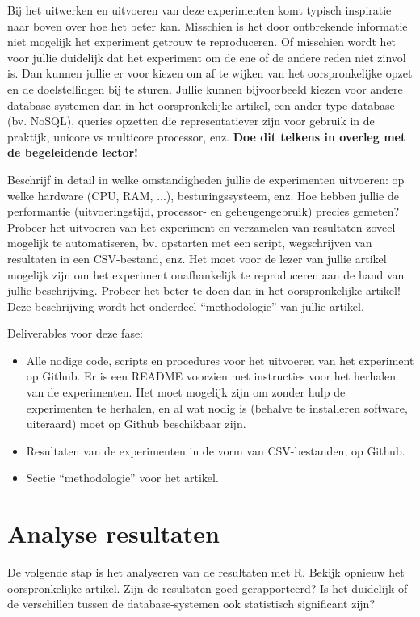 \documentclass[fleqn,10pt]{voorstel}
\begin{document}
Bij het uitwerken en uitvoeren van deze experimenten komt typisch inspiratie naar boven over hoe het beter kan. Misschien is het door ontbrekende informatie niet mogelijk het experiment getrouw te reproduceren. Of misschien wordt het voor jullie duidelijk dat het experiment om de ene of de andere reden niet zinvol is. Dan kunnen jullie er voor kiezen om af te wijken van het oorspronkelijke opzet en de doelstellingen bij te sturen. Jullie kunnen bijvoorbeeld kiezen voor andere database-systemen dan in het oorspronkelijke artikel, een ander type database (bv. NoSQL), queries opzetten die representatiever zijn voor gebruik in de praktijk, unicore vs multicore processor, enz. \textbf{Doe dit telkens in overleg met de begeleidende lector!}

Beschrijf in detail in welke omstandigheden jullie de experimenten uitvoeren: op welke hardware (CPU, RAM, ...), besturingssysteem, enz. Hoe hebben jullie de performantie (uitvoeringstijd, processor- en geheugengebruik) precies gemeten? Probeer het uitvoeren van het experiment en verzamelen van resultaten zoveel mogelijk te automatiseren, bv. opstarten met een script, wegschrijven van resultaten in een CSV-bestand, enz. Het moet voor de lezer van jullie artikel mogelijk zijn om het experiment onafhankelijk te reproduceren aan de hand van jullie beschrijving. Probeer het beter te doen dan in het oorspronkelijke artikel! Deze beschrijving wordt het onderdeel ``methodologie'' van jullie artikel.

Deliverables voor deze fase:

\begin{itemize}
  \item Alle nodige code, scripts en procedures voor het uitvoeren van het experiment op Github. Er is een README voorzien met instructies voor het herhalen van de experimenten. Het moet mogelijk zijn om zonder hulp de experimenten te herhalen, en al wat nodig is (behalve te installeren software, uiteraard) moet op Github beschikbaar zijn.
  \item Resultaten van de experimenten in de vorm van CSV-bestanden, op Github.
  \item Sectie ``methodologie'' voor het artikel.
\end{itemize}

\section{Analyse resultaten}

De volgende stap is het analyseren van de resultaten met R. Bekijk opnieuw het oorspronkelijke artikel. Zijn de resultaten goed gerapporteerd? Is het duidelijk of de verschillen tussen de database-systemen ook statistisch significant zijn?
\end{document}
